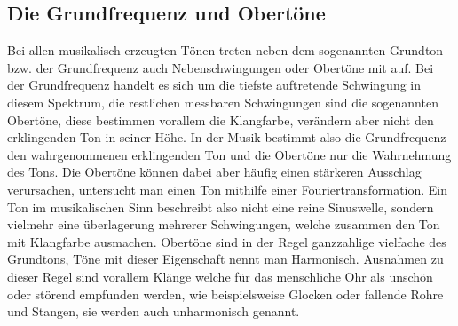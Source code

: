 \subsection*{Die Grundfrequenz und Obertöne}
\label{sec:Oberton} \label{sec:Nebenschwingung} \label{sec:Grundfrequenz}
Bei allen musikalisch erzeugten Tönen treten neben dem sogenannten Grundton bzw. der Grundfrequenz auch Nebenschwingungen oder Obertöne mit auf.
Bei der Grundfrequenz handelt es sich um die tiefste auftretende Schwingung in diesem Spektrum, die restlichen messbaren Schwingungen sind die sogenannten Obertöne, diese bestimmen vorallem die Klangfarbe, verändern aber nicht den erklingenden Ton in seiner Höhe.
In der Musik bestimmt also die Grundfrequenz den wahrgenommenen erklingenden Ton und die Obertöne nur die Wahrnehmung des Tons. Die Obertöne können dabei aber häufig einen stärkeren Ausschlag verursachen, untersucht man einen Ton mithilfe
einer Fouriertransformation. Ein Ton im musikalischen Sinn beschreibt also nicht eine reine Sinuswelle, sondern vielmehr eine überlagerung mehrerer Schwingungen, welche zusammen den Ton mit Klangfarbe ausmachen. Obertöne sind in der Regel ganzzahlige vielfache 
des Grundtons, Töne mit dieser Eigenschaft nennt man Harmonisch. Ausnahmen zu dieser Regel sind vorallem Klänge welche für das menschliche Ohr als unschön oder störend empfunden werden, wie
beispielsweise Glocken oder fallende Rohre und Stangen, sie werden auch unharmonisch genannt. \cite{abcmusik} \cite{harmonische_obertne}


